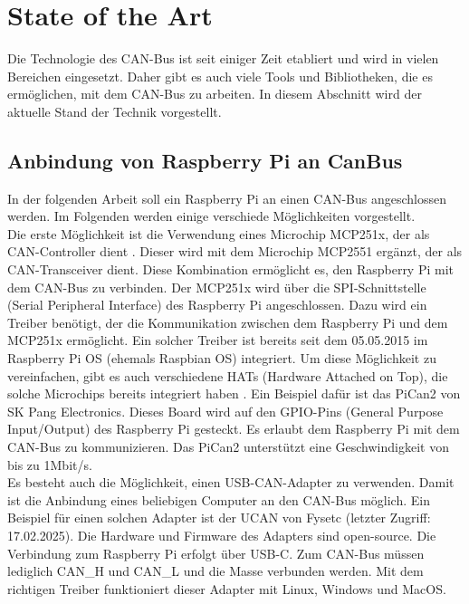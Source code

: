 \section{State of the Art}
Die Technologie des CAN-Bus ist seit einiger Zeit etabliert und wird in vielen Bereichen eingesetzt.
Daher gibt es auch viele Tools und Bibliotheken, die es ermöglichen, mit dem CAN-Bus zu arbeiten.
In diesem Abschnitt wird der aktuelle Stand der Technik vorgestellt.

\subsection{Anbindung von Raspberry Pi an CanBus}
In der folgenden Arbeit soll ein Raspberry Pi an einen CAN-Bus angeschlossen werden. 
Im Folgenden werden einige verschiede Möglichkeiten vorgestellt.\\
Die erste Möglichkeit ist die Verwendung eines Microchip MCP251x, der als CAN-Controller dient \cite{Salunkhe2016}. Dieser wird 
mit dem Microchip MCP2551 ergänzt, der als CAN-Transceiver dient. Diese Kombination ermöglicht es, den
Raspberry Pi mit dem CAN-Bus zu verbinden. Der MCP251x wird über die SPI-Schnittstelle (Serial Peripheral Interface) 
des Raspberry Pi angeschlossen. Dazu wird ein Treiber benötigt, der die Kommunikation zwischen dem Raspberry Pi und dem
MCP251x ermöglicht. Ein solcher Treiber ist bereits seit dem 05.05.2015 im Raspberry Pi OS (ehemals Raspbian OS)
integriert. 
Um diese Möglichkeit zu vereinfachen, gibt es auch verschiedene HATs (Hardware Attached on Top), die solche Microchips
bereits integriert haben \cite{Pant2019}. Ein Beispiel dafür ist das PiCan2 von SK Pang Electronics. Dieses Board wird auf den 
GPIO-Pins (General Purpose Input/Output) des Raspberry Pi gesteckt. Es erlaubt dem Raspberry Pi mit dem CAN-Bus
zu kommunizieren. Das PiCan2 unterstützt eine Geschwindigkeit von bis zu 1Mbit/s. \\
Es besteht auch die Möglichkeit, einen USB-CAN-Adapter zu verwenden. Damit ist die Anbindung eines 
beliebigen Computer an den CAN-Bus möglich.
Ein Beispiel für einen solchen Adapter ist der UCAN von Fysetc \cite{FysetcUCAN} (letzter Zugriff: 17.02.2025). 
Die Hardware und Firmware des Adapters
sind open-source. Die Verbindung zum Raspberry Pi erfolgt über USB-C.
Zum CAN-Bus müssen lediglich CAN\_H und CAN\_L und die Masse verbunden werden. Mit dem richtigen Treiber funktioniert
dieser Adapter mit Linux, Windows und MacOS.  



